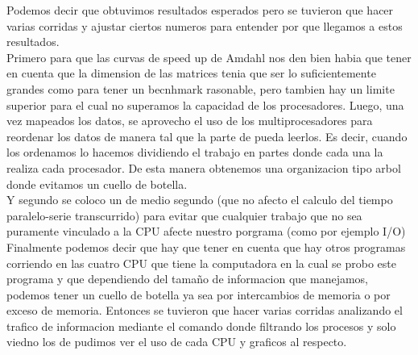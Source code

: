 Podemos decir que obtuvimos resultados esperados pero se tuvieron que hacer
varias corridas y ajustar ciertos numeros para entender por que llegamos a estos
resultados. \\
Primero para que las curvas de speed up de Amdahl nos den bien habia
que tener en cuenta que la dimension de las matrices tenia que ser lo
suficientemente grandes como para tener un becnhmark rasonable, pero tambien hay
un limite superior para el cual no superamos la capacidad de los procesadores.
Luego, una vez mapeados los datos, se aprovecho el uso de los multiprocesadores
para reordenar los datos de manera tal que la parte de  pueda leerlos.
Es decir, cuando los ordenamos lo hacemos dividiendo el trabajo en partes donde
cada una la realiza cada procesador. De esta manera obtenemos una organizacion
tipo arbol donde evitamos un cuello de botella.\\
Y segundo se coloco un  de medio segundo (que no afecto el calculo
del tiempo paralelo-serie transcurrido) para evitar que cualquier trabajo que no
sea puramente vinculado a la CPU afecte nuestro porgrama (como por ejemplo I/O)\\
Finalmente podemos decir que hay que tener en cuenta que hay otros programas
corriendo en las cuatro CPU que tiene la computadora en la cual se probo este
programa y que dependiendo del tamaño de informacion que manejamos, podemos tener
un cuello de botella ya sea por intercambios de memoria o por exceso de memoria.
Entonces se tuvieron que hacer varias corridas analizando el trafico de
informacion mediante el comando  donde filtrando
los procesos y solo viedno los de  pudimos ver el uso de cada CPU
y graficos al respecto.
